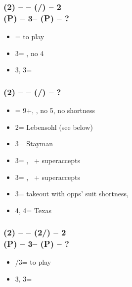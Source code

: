 \documentclass[12pt, a4paper]{report}
\begin{document}
        \subsubsection*{(2\diams) -- \dbl -- (\rdbl/\pass) -- 2\nt \\
                        (P) -- 3\clubs -- (P) -- ?}        
        \begin{itemize}
            \item \pass = to play
            \item 3\diams = \gf, no 4\major \vimp
            \item 3\hearts, 3\spades = \inv
        \end{itemize}

        \subsubsection*{(2\diams) -- \dbl -- (\hearts/\spades) -- ?}        
        \begin{itemize}
            \item \dbl = 9+, \fton{2\nt}, no 5\major, no \major shortness
            \item 2\nt = Lebensohl (see below)
            \item 3\clubs = Stayman \vimp
            \item 3\diams = \trsf{\hearts}, \gf\ + superaccepts
            \item 3\hearts = \trsf{\spades}, \gf\ + superaccepts
            \item 3\spades = takeout with opps' suit shortness, \gf
            \item 4\diams, 4\hearts = Texas
        \end{itemize}

        \subsubsection*{(2\diams) -- \dbl -- (2\hearts/\spades) -- 2\nt \\
                        (P) -- 3\clubs -- (P) -- ?}        
        \begin{itemize}
            \item \pass/3\diams = to play
            \item 3\hearts, 3\spades = \inv
        \end{itemize}
\end{document}
